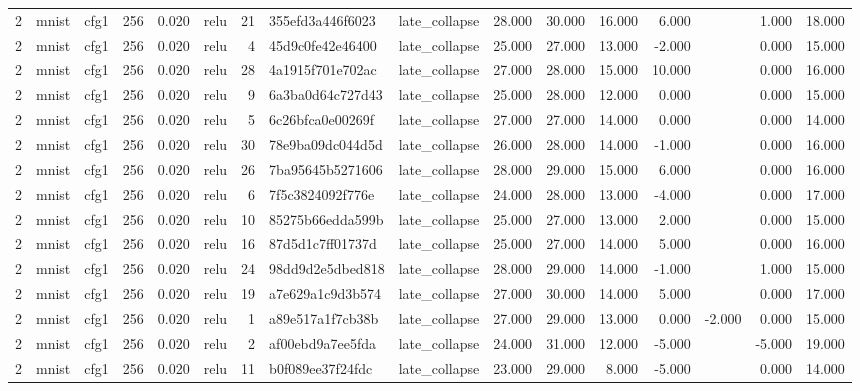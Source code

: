 \begin{table}[htbp]
{\begin{tabular}{@{}rllrrlrllrrrrrrr@{}}
2 & mnist & cfg1 & 256 & 0.020 & relu & 21 & 355efd3a446f6023 & late\_collapse & 28.000 & 30.000 & 16.000 & 6.000 &  & 1.000 & 18.000 \\
2 & mnist & cfg1 & 256 & 0.020 & relu & 4 & 45d9c0fe42e46400 & late\_collapse & 25.000 & 27.000 & 13.000 & -2.000 &  & 0.000 & 15.000 \\
2 & mnist & cfg1 & 256 & 0.020 & relu & 28 & 4a1915f701e702ac & late\_collapse & 27.000 & 28.000 & 15.000 & 10.000 &  & 0.000 & 16.000 \\
2 & mnist & cfg1 & 256 & 0.020 & relu & 9 & 6a3ba0d64c727d43 & late\_collapse & 25.000 & 28.000 & 12.000 & 0.000 &  & 0.000 & 15.000 \\
2 & mnist & cfg1 & 256 & 0.020 & relu & 5 & 6c26bfca0e00269f & late\_collapse & 27.000 & 27.000 & 14.000 & 0.000 &  & 0.000 & 14.000 \\
2 & mnist & cfg1 & 256 & 0.020 & relu & 30 & 78e9ba09dc044d5d & late\_collapse & 26.000 & 28.000 & 14.000 & -1.000 &  & 0.000 & 16.000 \\
2 & mnist & cfg1 & 256 & 0.020 & relu & 26 & 7ba95645b5271606 & late\_collapse & 28.000 & 29.000 & 15.000 & 6.000 &  & 0.000 & 16.000 \\
2 & mnist & cfg1 & 256 & 0.020 & relu & 6 & 7f5c3824092f776e & late\_collapse & 24.000 & 28.000 & 13.000 & -4.000 &  & 0.000 & 17.000 \\
2 & mnist & cfg1 & 256 & 0.020 & relu & 10 & 85275b66edda599b & late\_collapse & 25.000 & 27.000 & 13.000 & 2.000 &  & 0.000 & 15.000 \\
2 & mnist & cfg1 & 256 & 0.020 & relu & 16 & 87d5d1c7ff01737d & late\_collapse & 25.000 & 27.000 & 14.000 & 5.000 &  & 0.000 & 16.000 \\
2 & mnist & cfg1 & 256 & 0.020 & relu & 24 & 98dd9d2e5dbed818 & late\_collapse & 28.000 & 29.000 & 14.000 & -1.000 &  & 1.000 & 15.000 \\
2 & mnist & cfg1 & 256 & 0.020 & relu & 19 & a7e629a1c9d3b574 & late\_collapse & 27.000 & 30.000 & 14.000 & 5.000 &  & 0.000 & 17.000 \\
2 & mnist & cfg1 & 256 & 0.020 & relu & 1 & a89e517a1f7cb38b & late\_collapse & 27.000 & 29.000 & 13.000 & 0.000 & -2.000 & 0.000 & 15.000 \\
2 & mnist & cfg1 & 256 & 0.020 & relu & 2 & af00ebd9a7ee5fda & late\_collapse & 24.000 & 31.000 & 12.000 & -5.000 &  & -5.000 & 19.000 \\
2 & mnist & cfg1 & 256 & 0.020 & relu & 11 & b0f089ee37f24fdc & late\_collapse & 23.000 & 29.000 & 8.000 & -5.000 &  & 0.000 & 14.000 \\

\end{tabular}}
\end{table}
